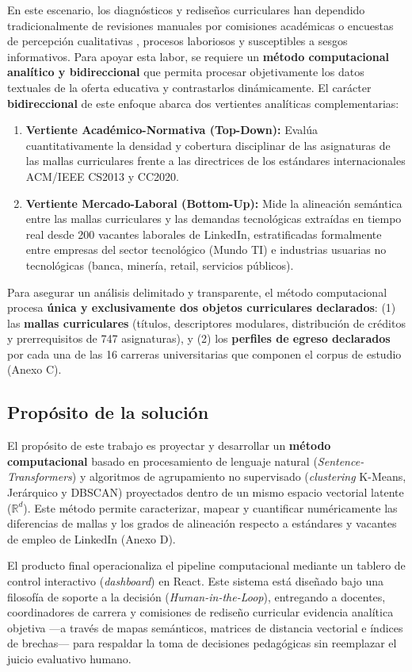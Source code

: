 En este escenario, los diagnósticos y rediseños curriculares han dependido tradicionalmente de revisiones manuales por comisiones académicas o encuestas de percepción cualitativas \citep{contreras_diseno_nodate,diaz-quezada_rediseno_2019}, procesos laboriosos y susceptibles a sesgos informativos. Para apoyar esta labor, se requiere un \textbf{método computacional analítico y bidireccional} que permita procesar objetivamente los datos textuales de la oferta educativa y contrastarlos dinámicamente. El carácter \textbf{bidireccional} de este enfoque abarca dos vertientes analíticas complementarias:
\begin{enumerate}[label=\alph*)]
	\item \textbf{Vertiente Académico-Normativa (Top-Down):} Evalúa cuantitativamente la densidad y cobertura disciplinar de las asignaturas de las mallas curriculares frente a las directrices de los estándares internacionales ACM/IEEE CS2013 y CC2020.
	\item \textbf{Vertiente Mercado-Laboral (Bottom-Up):} Mide la alineación semántica entre las mallas curriculares y las demandas tecnológicas extraídas en tiempo real desde 200 vacantes laborales de LinkedIn, estratificadas formalmente entre empresas del sector tecnológico (Mundo TI) e industrias usuarias no tecnológicas (banca, minería, retail, servicios públicos).
\end{enumerate}

Para asegurar un análisis delimitado y transparente, el método computacional procesa \textbf{única y exclusivamente dos objetos curriculares declarados}: (1) las \textbf{mallas curriculares} (títulos, descriptores modulares, distribución de créditos y prerrequisitos de 747 asignaturas), y (2) los \textbf{perfiles de egreso declarados} por cada una de las 16 carreras universitarias que componen el corpus de estudio (Anexo C).

\subsection{Propósito de la solución}
\label{sec:purpose}

El propósito de este trabajo es proyectar y desarrollar un \textbf{método computacional} basado en procesamiento de lenguaje natural (\textit{Sentence-Transformers}) y algoritmos de agrupamiento no supervisado (\textit{clustering} K-Means, Jerárquico y DBSCAN) proyectados dentro de un mismo espacio vectorial latente ($\mathbb{R}^d$). Este método permite caracterizar, mapear y cuantificar numéricamente las diferencias de mallas y los grados de alineación respecto a estándares y vacantes de empleo de LinkedIn (Anexo D).

El producto final operacionaliza el pipeline computacional mediante un tablero de control interactivo (\textit{dashboard}) en React. Este sistema está diseñado bajo una filosofía de soporte a la decisión (\textit{Human-in-the-Loop}), entregando a docentes, coordinadores de carrera y comisiones de rediseño curricular evidencia analítica objetiva —a través de mapas semánticos, matrices de distancia vectorial e índices de brechas— para respaldar la toma de decisiones pedagógicas sin reemplazar el juicio evaluativo humano.
